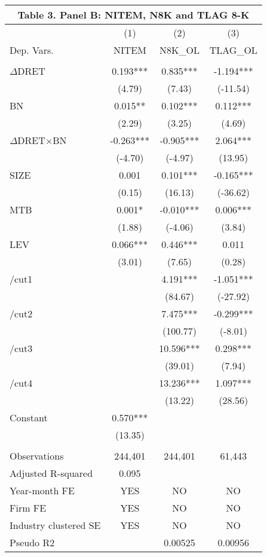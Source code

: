 \begin{table}[htbp] \label{T3PB}
  \centering
    \begin{tabular}{lccc}
    \multicolumn{4}{c}{\textbf{Table 3. Panel B: NITEM, N8K and TLAG 8-K}} \\
    \midrule
      & (1) & (2) & (3) \\
    Dep. Vars. & NITEM & N8K\_OL & TLAG\_OL \\
    \midrule
      &   &   &  \\
    $\Delta$DRET & 0.193*** & 0.835*** & -1.194*** \\
      & (4.79) & (7.43) & (-11.54) \\
    BN & 0.015** & 0.102*** & 0.112*** \\
      & (2.29) & (3.25) & (4.69) \\
    \rowcolor[rgb]{ .933,  .925,  .882} $\Delta$DRET$\times$BN & -0.263*** & -0.905*** & 2.064*** \\
    \rowcolor[rgb]{ .933,  .925,  .882}   & (-4.70) & (-4.97) & (13.95) \\
    SIZE & 0.001 & 0.101*** & -0.165*** \\
      & (0.15) & (16.13) & (-36.62) \\
    MTB & 0.001* & -0.010*** & 0.006*** \\
      & (1.88) & (-4.06) & (3.84) \\
    LEV & 0.066*** & 0.446*** & 0.011 \\
      & (3.01) & (7.65) & (0.28) \\
    /cut1 &   & 4.191*** & -1.051*** \\
      &   & (84.67) & (-27.92) \\
    /cut2 &   & 7.475*** & -0.299*** \\
      &   & (100.77) & (-8.01) \\
    /cut3 &   & 10.596*** & 0.298*** \\
      &   & (39.01) & (7.94) \\
    /cut4 &   & 13.236*** & 1.097*** \\
      &   & (13.22) & (28.56) \\
    Constant & 0.570*** &   &  \\
      & (13.35) &   &  \\
      &   &   &  \\
    Observations & 244,401 & 244,401 & 61,443 \\
    Adjusted R-squared & 0.095 &   &  \\
    Year-month FE & YES & NO & NO \\
    Firm FE & YES & NO & NO \\
    Industry clustered SE & YES & NO & NO \\
    Pseudo R2 &   & 0.00525 & 0.00956 \\
    \bottomrule
    \end{tabular}%
\end{table}%
